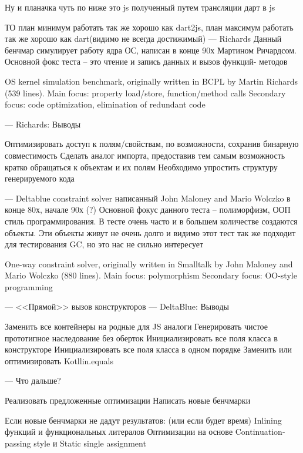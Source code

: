 Ну и планачка чуть по ниже это js полученный путем трансляции дарт в js

ТО план минимум работать так же хорошо как dart2js, план максимум работать так же хорошо как dart(видимо не всегда достижимый)
---
Richards
Данный бенчмар симулирует работу ядра ОС, написан в конце 90х Мартином Ричардсом.
Основной фокс теста -- это чтение и запись данных и вызов функций- методов

OS kernel simulation benchmark, originally written in BCPL by Martin Richards (539 lines).
Main focus: property load/store, function/method calls
Secondary focus: code optimization, elimination of redundant code

---
Richards: Выводы

Оптимизировать доступ к полям/свойствам, по возможности, сохранив бинарную совместимость
Сделать аналог импорта, предоставив тем самым возможность кратко обращаться к объектам и их полям
Необходимо упростить структуру генерируемого кода

---
Deltablue
constraint solver написанный John Maloney and Mario Wolczko в конце 80х, начале 90х (?)
Основной фокус данного теста -- полиморфизм, ООП стиль программирования. В тесте очень часто и в большем количестве создаются объекты. Эти объекты живут не очень долго и видимо этот тест так же подходит для тестирования GC, но это нас не сильно интересует

One-way constraint solver, originally written in Smalltalk by John Maloney and Mario Wolczko (880 lines).
Main focus: polymorphism
Secondary focus: OO-style programming

---
<<Прямой>> вызов конструкторов
---
DeltaBlue: Выводы

Заменить все контейнеры на родные для JS аналоги
Генерировать чистое прототипное наследование без оберток
Инициализировать все поля класса в конструкторе
Инициализировать все поля класса в одном порядке
Заменить или оптимизировать Kotllin.equals

---
Что дальше?

Реализовать предложенные оптимизации
Написать новые бенчмарки

Если новые бенчмарки не дадут результатов: (или если будет время)
Inlining функций и функциональных литералов
Оптимизации на основе  Continuation-passing style и 
Static single assignment
